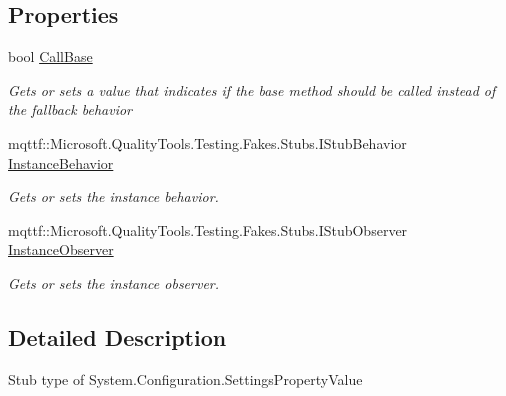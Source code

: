 \subsection*{Properties}
\begin{DoxyCompactItemize}
\item 
bool \hyperlink{class_system_1_1_configuration_1_1_fakes_1_1_stub_settings_property_value_ab464f73fdd83f5aa89fdf091e651ccf7}{Call\-Base}
\begin{DoxyCompactList}\small\item\em Gets or sets a value that indicates if the base method should be called instead of the fallback behavior\end{DoxyCompactList}\item 
mqttf\-::\-Microsoft.\-Quality\-Tools.\-Testing.\-Fakes.\-Stubs.\-I\-Stub\-Behavior \hyperlink{class_system_1_1_configuration_1_1_fakes_1_1_stub_settings_property_value_a023a25ae1c4643782f1123f193727f22}{Instance\-Behavior}
\begin{DoxyCompactList}\small\item\em Gets or sets the instance behavior.\end{DoxyCompactList}\item 
mqttf\-::\-Microsoft.\-Quality\-Tools.\-Testing.\-Fakes.\-Stubs.\-I\-Stub\-Observer \hyperlink{class_system_1_1_configuration_1_1_fakes_1_1_stub_settings_property_value_a04ddf4420e901f00fd6ba761b6a0270d}{Instance\-Observer}
\begin{DoxyCompactList}\small\item\em Gets or sets the instance observer.\end{DoxyCompactList}\end{DoxyCompactItemize}


\subsection{Detailed Description}
Stub type of System.\-Configuration.\-Settings\-Property\-Value



